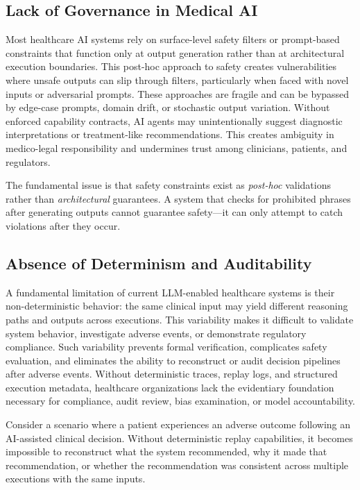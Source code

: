 \documentclass[journal]{IEEEtran}
\begin{document}
\subsection{Lack of Governance in Medical AI}
Most healthcare AI systems rely on surface-level safety filters or prompt-based constraints that function only at output generation rather than at architectural execution boundaries. This post-hoc approach to safety creates vulnerabilities where unsafe outputs can slip through filters, particularly when faced with novel inputs or adversarial prompts. These approaches are fragile and can be bypassed by edge-case prompts, domain drift, or stochastic output variation. Without enforced capability contracts, AI agents may unintentionally suggest diagnostic interpretations or treatment-like recommendations. This creates ambiguity in medico-legal responsibility and undermines trust among clinicians, patients, and regulators.

The fundamental issue is that safety constraints exist as \textit{post-hoc} validations rather than \textit{architectural} guarantees. A system that checks for prohibited phrases after generating outputs cannot guarantee safety—it can only attempt to catch violations after they occur.

\subsection{Absence of Determinism and Auditability}
A fundamental limitation of current LLM-enabled healthcare systems is their non-deterministic behavior: the same clinical input may yield different reasoning paths and outputs across executions. This variability makes it difficult to validate system behavior, investigate adverse events, or demonstrate regulatory compliance. Such variability prevents formal verification, complicates safety evaluation, and eliminates the ability to reconstruct or audit decision pipelines after adverse events. Without deterministic traces, replay logs, and structured execution metadata, healthcare organizations lack the evidentiary foundation necessary for compliance, audit review, bias examination, or model accountability.

Consider a scenario where a patient experiences an adverse outcome following an AI-assisted clinical decision. Without deterministic replay capabilities, it becomes impossible to reconstruct what the system recommended, why it made that recommendation, or whether the recommendation was consistent across multiple executions with the same inputs.
\end{document}
